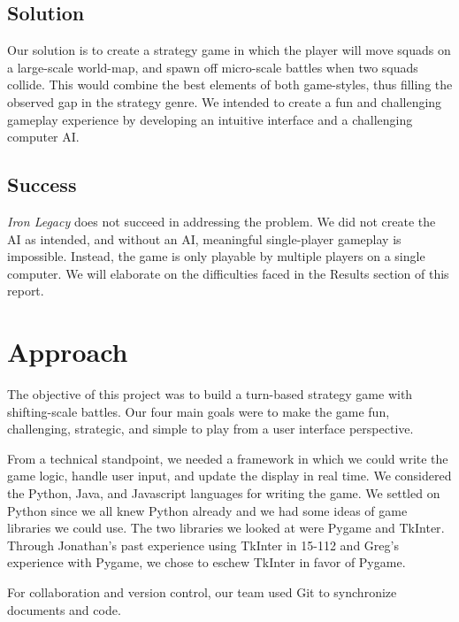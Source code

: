 \documentclass{article}
\begin{document}
\subsection*{Solution}
Our solution is to create a strategy game in which the player will move squads
on a large-scale world-map, and spawn off micro-scale battles when two squads
collide.
This would combine the best elements of both game-styles,
thus filling the observed gap in the strategy genre.
We intended to create a fun and challenging gameplay experience by developing
an intuitive interface and a challenging computer AI.

\subsection*{Success}
\emph{Iron Legacy} does not succeed in addressing the problem.
We did not create the AI as intended, and without an AI, meaningful 
single-player gameplay is impossible.
Instead, the game is only playable by multiple players on a single computer.
We will elaborate on the difficulties faced in the Results section of this
report.

\section*{Approach}
The objective of this project was to build a turn-based strategy game with 
shifting-scale battles.
Our four main goals were to make the game fun, challenging, strategic, and 
simple to play from a user interface perspective.

From a technical standpoint, we needed a framework in which we could write the
game logic, handle user input, and update the display in real time.
We considered the Python\cite{Python}, Java\cite{Java}, and 
Javascript\cite{Javascript} languages for writing the game. 
We settled on Python since we all knew Python already and we had some ideas of
game libraries we could use.
The two libraries we looked at were Pygame\cite{Pygame} and 
TkInter\cite{TkInter}.
Through Jonathan's past experience using TkInter in 15-112 and Greg's 
experience with Pygame, we chose to eschew TkInter in favor of Pygame.

For collaboration and version control, our team used Git \cite{Git} to
synchronize documents and code.

\end{document}
